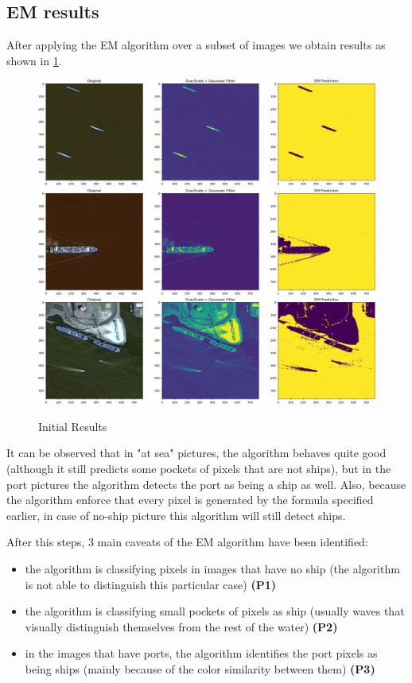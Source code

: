 \subsection{EM results}
\label{emres}
After applying the EM algorithm over a subset of images we obtain results as shown in \ref{init_result}.

\begin{figure}[h]
	\includegraphics[width=\textwidth]{Pictures/009Ex1.png}\\
	\includegraphics[width=\textwidth]{Pictures/009Ex2.png}\\
	\includegraphics[width=\textwidth]{Pictures/009Ex3.png}
	\caption{Initial Results}
	\label{init_result}
\end{figure}

It can be observed that in "at sea" pictures, the algorithm behaves quite good
(although it still predicts some pockets of pixels that are not ships), but in
the port pictures the algorithm detects the port as being a ship as well.
Also, because the algorithm enforce that every pixel is generated by the
formula specified earlier, in case of no-ship picture this algorithm will still
detect ships.

After this steps, 3 main caveats of the EM algorithm have been identified:
\begin{itemize}
	\item [1.] the algorithm is classifying pixels in images that have no ship (the algorithm is not able to distinguish this particular case) \textbf{(P1)}
	\item [2.] the algorithm is classifying small pockets of pixels as ship (usually waves that visually distinguish themselves from the rest of the water) \textbf{(P2)}
	\item [3.] in the images that have ports, the algorithm identifies the port pixels as being ships (mainly because of the color similarity between them) \textbf{(P3)}
\end{itemize}

